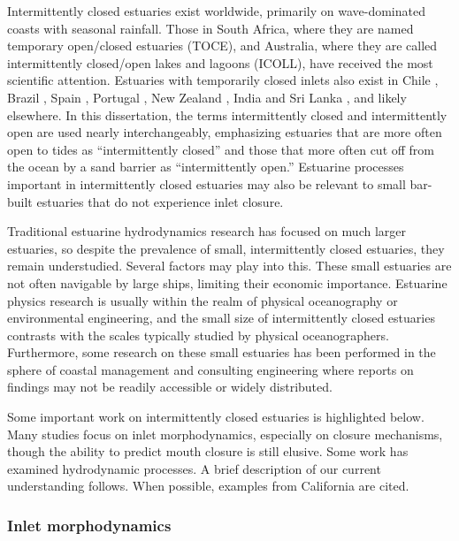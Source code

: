 Intermittently closed estuaries exist worldwide, primarily on wave-dominated coasts with seasonal rainfall. Those in South Africa, where they are named temporary open/closed estuaries (TOCE), and Australia, where they are called intermittently closed/open lakes and lagoons (ICOLL), have received the most scientific attention. Estuaries with temporarily closed inlets also exist in Chile \parencite{dussaillant_water_2009}, Brazil \parencite{suzuki_effects_1998}, Spain \parencite{moreno_morphodynamics_2010}, Portugal \parencite{fortunato_morphological_2014}, New Zealand \parencite{schallenberg_contrasting_2010}, India and Sri Lanka \parencite{ranasinghe_seasonal_2003}, and likely elsewhere. In this dissertation, the terms intermittently closed and intermittently open are used nearly interchangeably, emphasizing estuaries that are more often open to tides as ``intermittently closed'' and those that more often cut off from the ocean by a sand barrier as ``intermittently open.'' Estuarine processes important in intermittently closed estuaries may also be relevant to small bar-built estuaries that do not experience inlet closure. 

Traditional estuarine hydrodynamics research has focused on much larger estuaries, so despite the prevalence of small, intermittently closed estuaries, they remain understudied.  Several factors may play into this. These small estuaries are not often navigable by large ships, limiting their economic importance. Estuarine physics research is usually within the realm of physical oceanography or environmental engineering, and the small size of intermittently closed estuaries contrasts with the scales typically studied by physical oceanographers. Furthermore, some research on these small estuaries has been performed in the sphere of coastal management and consulting engineering where reports on findings may not be readily accessible or widely distributed.

Some important work on intermittently closed estuaries is highlighted below. Many studies focus on inlet morphodynamics, especially on closure mechanisms, though the ability to predict mouth closure is still elusive. Some work has examined hydrodynamic processes. A brief description of our current understanding follows. When possible, examples from California are cited.

\subsubsection{Inlet morphodynamics}

